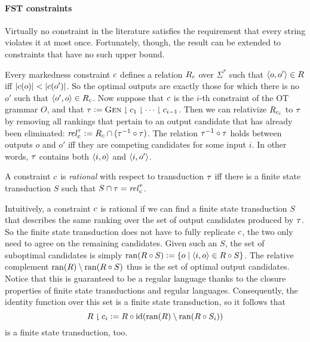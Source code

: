 \paragraph{FST constraints}
Virtually no constraint in the literature satisfies the requirement that every string violates it at most once.
Fortunately, though, the result can be extended to constraints that have no such upper bound.

Every markedness constraint $c$ defines a relation $R_{c}$ over $\Sigma^*$ such that $\left \langle o,o' \right \rangle  \in R$ iff $| c(o) | < | c(o') |$.
So the optimal outputs are exactly those for which there is no $o'$ such that $\left \langle o',o \right \rangle  \in R_{c}$.
Now suppose that $c$ is the $i$-th constraint of the OT grammar $O$, and that $\tau \mathrel{\mathop:}= \textsc{Gen} \downharpoonright c_1 \downharpoonright \cdots \downharpoonright c_{i-1}$.
Then we can relativize $R_{c_i}$ to $\tau$ by removing all rankings that pertain to an output candidate that has already been eliminated: $\mathit{rel}^{\tau}_{c} \mathrel{\mathop:}= R_{c} \cap (\tau^{-1} \circ \tau)$.
The relation $\tau^{-1} \circ \tau$ holds between outputs $o$ and $o'$ iff they are competing candidates for some input $i$.
In other words, $\tau$ contains both $\left \langle i,o \right \rangle $ and $\left \langle i,o' \right \rangle $.
%
\begin{definition}
    A constraint $c$ is \emph{rational} with respect to transduction $\tau$ iff there is a finite state transduction $S$ such that $S \cap \tau = \mathit{rel}^{\tau}_{c}$.
\end{definition}
%
Intuitively, a constraint $c$ is rational if we can find a finite state transduction $S$ that describes the same ranking over the set of output candidates produced by $\tau$.
So the finite state transduction does not have to fully replicate $c$, the two only need to agree on the remaining candidates.
Given such an $S$, the set of suboptimal candidates is simply $\mathop{\mathrm{ran}}(R \circ S) \mathrel{\mathop:}= \left \{  o \mid \left \langle i,o \right \rangle  \in R \circ S \right \}$.
The relative complement $\mathop{\mathrm{ran}}(R) \setminus \mathop{\mathrm{ran}}(R \circ S)$ thus is the set of optimal output candidates.
Notice that this is guaranteed to be a regular language thanks to the closure properties of finite state transductions and regular languages.
Consequently, the identity function over this set is a finite state transduction, so it follows that
%
\[
    R \downharpoonright c_i \mathrel{\mathop:}=
        R \circ \mathrm{id}(\mathop{\mathrm{ran}}(R) \setminus \mathop{\mathrm{ran}}(R \circ S_i))
\]
%
is a finite state transduction, too.
